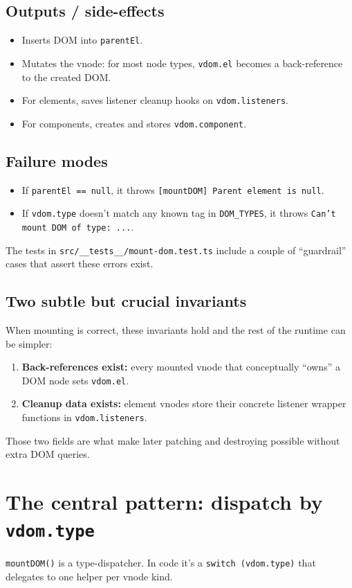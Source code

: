 \subsection*{Outputs / side-effects}
\begin{itemize}
  \item Inserts DOM into \texttt{parentEl}.
  \item Mutates the vnode: for most node types, \texttt{vdom.el} becomes a back-reference to the created DOM.
  \item For elements, saves listener cleanup hooks on \texttt{vdom.listeners}.
  \item For components, creates and stores \texttt{vdom.component}.
\end{itemize}

\subsection*{Failure modes}
\begin{itemize}
  \item If \texttt{parentEl == null}, it throws \texttt{[mountDOM] Parent element is null}.
  \item If \texttt{vdom.type} doesn't match any known tag in \texttt{DOM\_TYPES}, it throws \texttt{Can't mount DOM of type: ...}.
\end{itemize}

The tests in \texttt{src/\_\_tests\_\_/mount-dom.test.ts} include a couple of ``guardrail'' cases that assert these errors exist.

\subsection*{Two subtle but crucial invariants}
When mounting is correct, these invariants hold and the rest of the runtime can be simpler:

\begin{enumerate}
  \item \textbf{Back-references exist:} every mounted vnode that conceptually ``owns'' a DOM node sets \texttt{vdom.el}.
  \item \textbf{Cleanup data exists:} element vnodes store their concrete listener wrapper functions in \texttt{vdom.listeners}.
\end{enumerate}

Those two fields are what make later patching and destroying possible without extra DOM queries.

\section{The central pattern: dispatch by \texttt{vdom.type}}
	\texttt{mountDOM()} is a type-dispatcher. In code it's a \texttt{switch (vdom.type)} that delegates to one helper per vnode kind.

